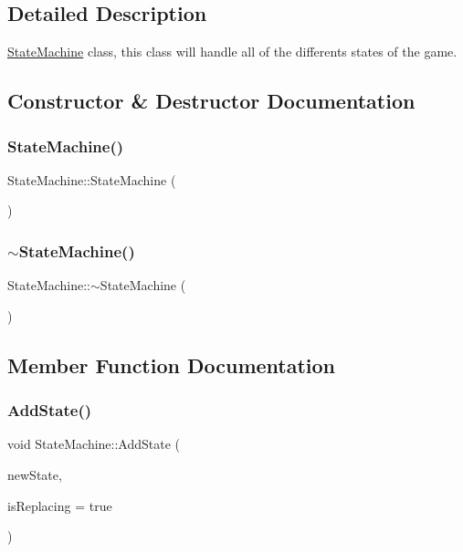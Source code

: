 \subsection{Detailed Description}
\mbox{\hyperlink{classStateMachine}{State\+Machine}} class, this class will handle all of the differents states of the game. 

\subsection{Constructor \& Destructor Documentation}
\mbox{\label{classStateMachine_a2fb07002510ea9141019559750acfab8}} 
\subsubsection{\texorpdfstring{State\+Machine()}{StateMachine()}}
{\footnotesize\ttfamily State\+Machine\+::\+State\+Machine (\begin{DoxyParamCaption}{ }\end{DoxyParamCaption})}

\mbox{\label{classStateMachine_a93d66cb2a89b186789d655a08b02674e}} 
\subsubsection{\texorpdfstring{$\sim$\+State\+Machine()}{~StateMachine()}}
{\footnotesize\ttfamily State\+Machine\+::$\sim$\+State\+Machine (\begin{DoxyParamCaption}{ }\end{DoxyParamCaption})}



\subsection{Member Function Documentation}
\mbox{\label{classStateMachine_a0ce4894da8a4f2312b1035713fb48c08}} 
\subsubsection{\texorpdfstring{Add\+State()}{AddState()}}
{\footnotesize\ttfamily void State\+Machine\+::\+Add\+State (\begin{DoxyParamCaption}\item[{\mbox{\hyperlink{StateMachine_8h_a217d9c9b187e9dd27abb46be48fb014d}{State\+Ref}}}]{new\+State,  }\item[{bool}]{is\+Replacing = {\ttfamily true} }\end{DoxyParamCaption})}



